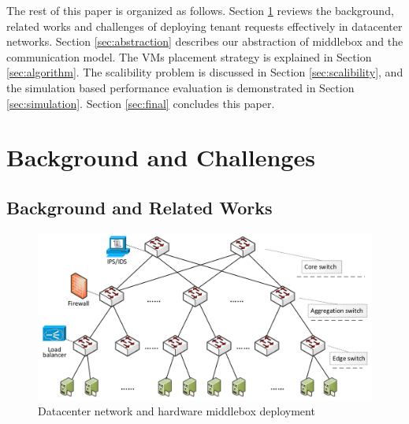 \documentclass[review]{elsarticle}
\begin{document}

The rest of this paper is organized as follows. Section  \ref{sec:background} reviews the background, related works and challenges of deploying tenant requests effectively in datacenter networks.
Section \ref{sec:abstraction} describes our abstraction of middlebox and the communication model. The VMs placement strategy is explained in Section \ref{sec:algorithm}. The scalibility problem is discussed in Section \ref{sec:scalibility}, and the simulation based performance evaluation is demonstrated in Section \ref{sec:simulation}. Section \ref{sec:final} concludes this paper.

\section{Background and Challenges}\label{sec:background}
\subsection{Background and Related Works}


\begin{figure}
	\centering
	\includegraphics[width=4.5in]{fig/topology.pdf}
	\caption{Datacenter network and hardware middlebox deployment}
	\label{fig:topo}
\end{figure}
\end{document}
